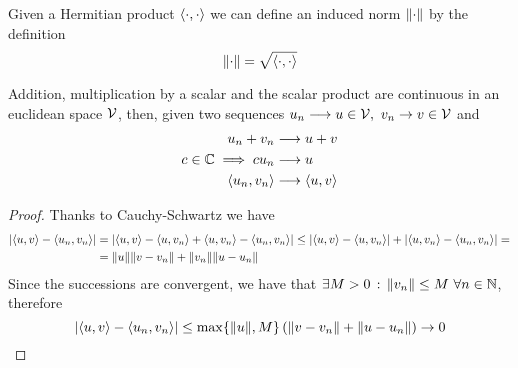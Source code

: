 \documentclass[../complete.tex]{subfiles}
\begin{document}
\begin{thm}
	Given a Hermitian product $\langle \cdot, \cdot \rangle$ we can define an induced norm $\norm{\cdot}$ by the definition
	\begin{equation}
		\norm{\cdot}=\sqrt{\langle \cdot, \cdot \rangle}
		\label{eq:indnorm}
	\end{equation}
\end{thm}
\begin{thm}
	Addition, multiplication by a scalar and the scalar product are continuous in an euclidean space $\mathcal{V}$, then, given two sequences $u_n\fto u\in\V,\ v_n\to v\in\V$ and
	\begin{equation*}
		\begin{aligned}
			u_n+v_n&\overset{}{\longrightarrow} u+v\\
			c\in\mathbb{C}\implies cu_n&\overset{}{\longrightarrow} u\\
			\langle u_n, v_n \rangle&\overset{}{\longrightarrow}\langle u, v \rangle
		\end{aligned}
	\end{equation*}
\end{thm}
\begin{proof}
	Thanks to Cauchy-Schwartz we have
	\begin{equation*}
		\begin{aligned}
			\abs{\langle u, v \rangle-\langle u_n, v_n \rangle}&=\abs{\langle u, v \rangle-\langle u, v_n \rangle+\langle u, v_n \rangle-\langle u_n, v_n \rangle}\le\abs{\langle u, v \rangle-\langle u, v_n \rangle}+\abs{\langle u, v_n \rangle-\langle u_n, v_n \rangle}=\\
			&=\norm{u}\norm{v-v_n}+\norm{v_n}\norm{u-u_n}
		\end{aligned}
	\end{equation*}
	Since the successions are convergent, we have that $\exists M>0\st\norm{v_n}\le M\ \forall n\in\N$, therefore
	\begin{equation*}
		\abs{\langle u, v \rangle-\langle u_n, v_n \rangle}\le\max\{\norm{u},M\}\left( \norm{v-v_n}+\norm{u-u_n} \right)\to0
	\end{equation*}
\end{proof}
\end{document}
